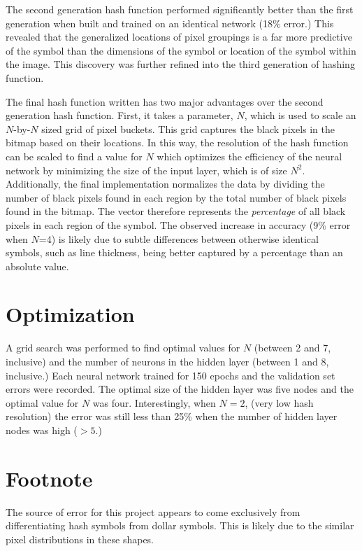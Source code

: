 \documentclass[10pt,a4paper,titlepage]{article}
\begin{document}
	The second generation hash function performed significantly better than the first generation when built and trained on an identical network (18\% error.)  This revealed that the generalized locations of pixel groupings is a far more predictive of the symbol than the dimensions of the symbol or location of the symbol within the image.  This discovery was further refined into the third generation of hashing function.
	
	The final hash function written has two major advantages over the second generation hash function.  First, it takes a parameter, $N$, which is used to scale an $N$-by-$N$ sized grid of pixel buckets. This grid captures the black pixels in the bitmap based on their locations.  In this way, the resolution of the hash function can be scaled to find a value for $N$ which optimizes the efficiency of the neural network by minimizing the size of the input layer, which is of size $N^2$.  Additionally, the final implementation normalizes the data by dividing the number of black pixels found in each region by the total number of black pixels found in the bitmap.  The vector therefore represents the \textit{percentage} of all black pixels in each region of the symbol.  The observed increase in accuracy (9\% error when $N$=4) is likely due to subtle differences between otherwise identical symbols, such as line thickness, being better captured by a percentage than an absolute value.
	
\section{Optimization}
	A grid search was performed to find optimal values for $N$ (between 2 and 7, inclusive) and the number of neurons in the hidden layer (between 1 and 8, inclusive.)  Each neural network trained for 150 epochs and the validation set errors were recorded.  The optimal size of the hidden layer was five nodes and the optimal value for $N$ was four.  Interestingly, when $N = 2$, (very low hash resolution) the error was still less than 25\% when the number of hidden layer nodes was high ($>5$.)
	
\section*{Footnote}
	The source of error for this project appears to come exclusively from differentiating hash symbols from dollar symbols.  This is likely due to the similar pixel distributions in these shapes.
\end{document}
